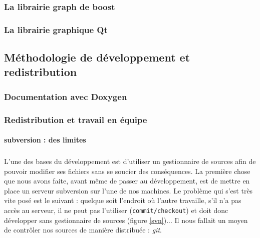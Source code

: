 \subsubsection{La librairie graph de boost}



\subsubsection{La librairie graphique Qt}


\subsection{Méthodologie de développement et redistribution}
\subsubsection{Documentation avec Doxygen}


\subsubsection{Redistribution et travail en équipe}
\paragraph{subversion : des limites}

\subparagraph{}
L'une des bases du développement est d'utiliser un gestionnaire de sources afin de pouvoir modifier ses fichiers sans se soucier des conséquences. La première chose que nous avons faite, avant même de passer au développement, est de mettre en place un serveur subversion sur l'une de nos machines. Le problème qui s'est très vite posé est le suivant : quelque soit l'endroit où l'autre travaille, s'il n'a pas accès au serveur, il ne peut pas l'utiliser (\verb|commit/checkout|) et doit donc développer sans gestionnaire de sources (figure \ref{svn})... Il nous fallait un moyen de contrôler nos sources de manière distribuée : \textit{git}.

